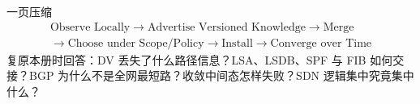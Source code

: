 \documentclass[11pt,a4paper]{ctexart}
\begin{document}
\begin{corebox}{一页压缩}
\[
\boxed{\begin{gathered}
\text{Observe Locally}\to\text{Advertise Versioned Knowledge}\to\text{Merge}\\
\to\text{Choose under Scope/Policy}\to\text{Install}\to\text{Converge over Time}
\end{gathered}}
\]
复原本册时回答：DV 丢失了什么路径信息？LSA、LSDB、SPF 与 FIB 如何交接？BGP 为什么不是全网最短路？收敛中间态怎样失败？SDN 逻辑集中究竟集中什么？
\end{corebox}
\end{document}
